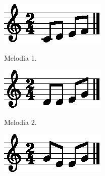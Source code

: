 \begin{figure}[!h]
     \centering
     \begin{subfigure}[b]{0.3\textwidth}
         \centering
         \href{https://drive.google.com/file/d/1U5BxdQXU9ICCFCV3OnFzpLpB9DjtDFaQ/view?usp=sharing}{\includegraphics[width=\textwidth]{chapters/cap-musicalidade-percepcion/melodia-chars-shape-1-1.eps}}
         \caption{Melodia 1.}
         \label{fig:melodia-chars-shape-1-1}
     \end{subfigure}
     \hfill
     \begin{subfigure}[b]{0.3\textwidth}
         \centering
         \href{https://drive.google.com/file/d/1wp8U3x5Z5lsfeWvAnSuY0UAiRfCeLfce/view?usp=sharing}{\includegraphics[width=\textwidth]{chapters/cap-musicalidade-percepcion/melodia-chars-shape-2-1.eps}}
         \caption{Melodia 2.}
         \label{fig:melodia-chars-shape-2-1}
     \end{subfigure}
     \hfill
     \begin{subfigure}[b]{0.3\textwidth}
         \centering
         \href{https://drive.google.com/file/d/11OGtv8owTiuFJzwmDIudR2kHO5KpfGLY/view?usp=sharing}{\includegraphics[width=\textwidth]{chapters/cap-musicalidade-percepcion/melodia-chars-shape-3-1.eps}}

\end{subfigure}
\end{figure}
